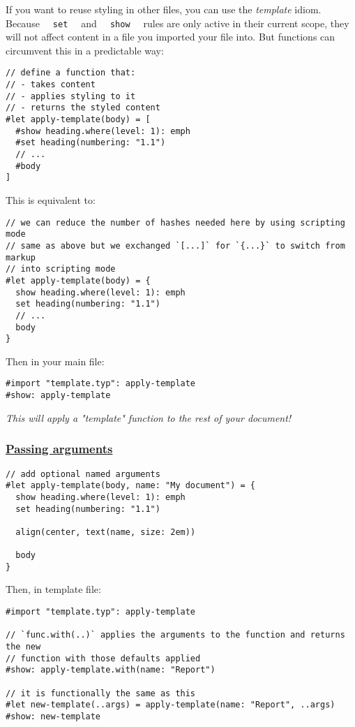 If you want to reuse styling in other files, you can use the
\emph{template} idiom. Because \texttt{\ }{\texttt{\ set\ }}\texttt{\ }
and \texttt{\ }{\texttt{\ show\ }}\texttt{\ } rules are only active in
their current scope, they will not affect content in a file you imported
your file into. But functions can circumvent this in a predictable way:

\begin{verbatim}
// define a function that:
// - takes content
// - applies styling to it
// - returns the styled content
#let apply-template(body) = [
  #show heading.where(level: 1): emph
  #set heading(numbering: "1.1")
  // ...
  #body
]
\end{verbatim}

This is equivalent to:

\begin{verbatim}
// we can reduce the number of hashes needed here by using scripting mode
// same as above but we exchanged `[...]` for `{...}` to switch from markup
// into scripting mode
#let apply-template(body) = {
  show heading.where(level: 1): emph
  set heading(numbering: "1.1")
  // ...
  body
}
\end{verbatim}

Then in your main file:

\begin{verbatim}
#import "template.typ": apply-template
#show: apply-template
\end{verbatim}

\emph{This will apply a "template" function to the rest of your
document!}

\subsubsection{\texorpdfstring{\hyperref[passing-arguments]{Passing
arguments}}{Passing arguments}}\label{passing-arguments}

\begin{verbatim}
// add optional named arguments
#let apply-template(body, name: "My document") = {
  show heading.where(level: 1): emph
  set heading(numbering: "1.1")

  align(center, text(name, size: 2em))

  body
}
\end{verbatim}

Then, in template file:

\begin{verbatim}
#import "template.typ": apply-template

// `func.with(..)` applies the arguments to the function and returns the new
// function with those defaults applied
#show: apply-template.with(name: "Report")

// it is functionally the same as this
#let new-template(..args) = apply-template(name: "Report", ..args)
#show: new-template
\end{verbatim}

